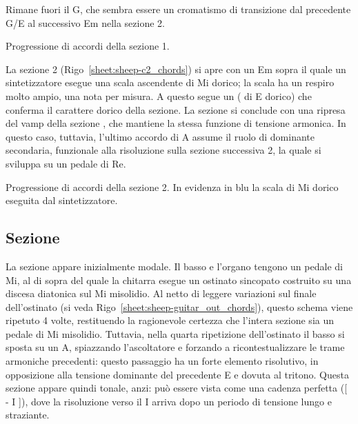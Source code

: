 \documentclass[class=book, crop=false, oneside, 12pt]{standalone}
\begin{document}
    Rimane fuori il G\flat, che sembra essere un cromatismo di transizione dal precedente G/E al successivo Em nella sezione 2.
    
    \begin{sheet}[htb]
        \centering
        \caption[Progressione di accordi della sezione 1.]{Progressione di accordi della sezione 1.}
        \label{sheet:sheep-c1_chords}
    \end{sheet}

    La sezione 2 (Rigo~\ref{sheet:sheep-c2_chords})  si apre con un Em  sopra il quale un sintetizzatore esegue una scala ascendente di Mi dorico; la scala ha un respiro molto ampio, una nota per misura. A questo segue un  ( di E dorico) che conferma il carattere dorico della sezione. La sezione si conclude con una ripresa del vamp della sezione , che mantiene la stessa funzione di tensione armonica. In questo caso, tuttavia, l'ultimo accordo di A assume il ruolo di dominante secondaria, funzionale alla risoluzione sulla sezione successiva 2, la quale si sviluppa su un pedale di Re.

    \begin{sheet}[htb]
        \centering
        \caption[Progressione di accordi della sezione 2.]{Progressione di accordi della sezione 2. In evidenza in blu la scala di Mi dorico eseguita dal sintetizzatore.}
        \label{sheet:sheep-c2_chords}
    \end{sheet}

    \subsection{Sezione }
    La sezione  appare inizialmente modale. Il basso e l'organo tengono un pedale di Mi, al di sopra del quale la chitarra esegue un ostinato sincopato costruito su una discesa diatonica sul Mi misolidio. Al netto di leggere variazioni sul finale dell'ostinato (si veda Rigo~\ref{sheet:sheep-guitar_out_chords}), questo schema viene ripetuto 4 volte, restituendo la ragionevole certezza che l'intera sezione sia un pedale di Mi misolidio. Tuttavia, nella quarta ripetizione dell'ostinato il basso si sposta su un A, spiazzando l'ascoltatore e forzando a ricontestualizzare le trame armoniche precedenti: questo passaggio ha un forte elemento risolutivo, in opposizione alla tensione dominante del precedente E e dovuta al tritono. Questa sezione appare quindi tonale, anzi: può essere vista come una cadenza perfetta ([  - I ]), dove la risoluzione verso il I arriva dopo un periodo di tensione lungo e straziante.
\end{document}
